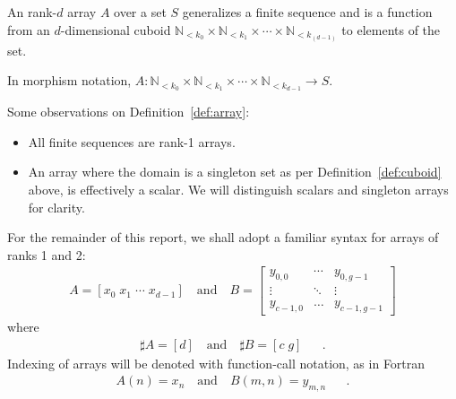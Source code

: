\documentclass{DIKU-report-variant}
\newcommand\Nat{\mathbb{N}}
\begin{document}
\begin{definition}
  \label{def:array}
  An rank-\(d\) array \(A\) over a set \(S\) generalizes a finite sequence and
  is a function from an \(d\)-dimensional cuboid
  \(\Nat_{<k_0} \times \Nat_{<k_1} \times \cdots \times \Nat_{<k_(d-1)}\) to elements of the set.

  In morphism notation, \(A : \Nat_{<k_0} \times \Nat_{<k_1} \times \cdots \times \Nat_{<k_{d-1}} \to S\).
\end{definition}
\begin{observation}
  \label{ob:array}
  Some observations on Definition~\ref{def:array}:
  \begin{itemize}
    \item All finite sequences are rank-1 arrays.
    \item An array where the domain is a singleton set as per Definition~\ref{def:cuboid} above,
      is effectively a scalar. We will distinguish scalars and singleton arrays for clarity.
  \end{itemize}
\end{observation}

\begin{remark}
  \label{rem:syntax}
  For the remainder of this report, we shall adopt a familiar syntax for arrays
  of ranks 1 and 2:
  \begin{align*}
    A = [ x_0\; x_1\; \cdots \; x_{d-1} ] \quad \text{and} \quad
    B = \begin{bmatrix}
      y_{0,0} & \cdots & y_{0,g-1} \\
      \vdots & \ddots & \vdots \\
      y_{c-1,0} & \dots  & y_{c-1,g-1} 
    \end{bmatrix}
  \end{align*}
  where
  \begin{align*}
    \sharp A = [d] \quad \text{and} \quad \sharp B = [ c\; g ] && .
  \end{align*}
  Indexing of arrays will be denoted with function-call notation, as in Fortran
  \begin{align*}
    A(n) = x_n \quad \text{and} \quad B(m,n) = y_{m,n} && .
  \end{align*}
\end{remark}
\end{document}
